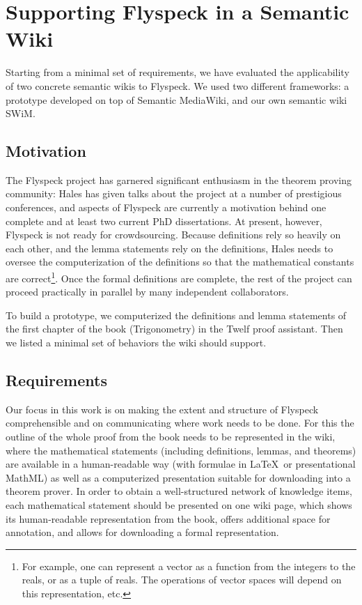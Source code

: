 
\section{Supporting Flyspeck in a Semantic Wiki}

Starting from a minimal set of requirements, we have evaluated the
applicability of two concrete semantic wikis to Flyspeck.  We used two
different frameworks: a prototype developed on top of Semantic
MediaWiki, and our own semantic wiki SWiM. 

\subsection{Motivation}
\label{sec:req}

The Flyspeck project has garnered significant enthusiasm in the theorem proving
community: Hales has given talks about the project at a number of prestigious
conferences, and aspects of Flyspeck are currently a motivation behind 
one complete and at least
two current PhD dissertations.  At present, however, Flyspeck is not ready for
crowdsourcing.  Because definitions rely so heavily on each other, and the lemma
statements rely on the definitions, Hales needs to oversee the computerization
of the definitions so that the mathematical constants are correct\footnote{For
  example, one can represent a vector as a function from the integers to the
  reals, or as a tuple of reals.  The operations of vector spaces will depend on
  this representation, etc.}.  Once the formal definitions are complete, the
rest of the project can proceed practically in parallel by
many independent collaborators.

To build a prototype, we computerized the definitions and lemma statements of
the first chapter of the book (Trigonometry) in the
Twelf\cite{Schurmann:1999:Twelf} proof assistant.  Then we
listed a minimal set of behaviors the wiki should support.

\subsection{Requirements}

Our focus in this work is on making the extent and structure of
Flyspeck comprehensible and on communicating where work needs to be
done.  For this the outline of the whole proof from the
book\cite{Hales:2007:FlyspeckBook} needs to be represented in the
wiki, where the mathematical statements (including definitions,
lemmas, and theorems) are available in a human-readable way (with
formulae in \LaTeX\ or presentational MathML) as well as a
computerized presentation suitable for downloading into a theorem
prover.  In order to obtain a well-structured network of knowledge
items, each mathematical statement should be presented on one wiki
page, which shows its human-readable representation from the book,
offers additional space for annotation, and allows for downloading a
formal representation.  

